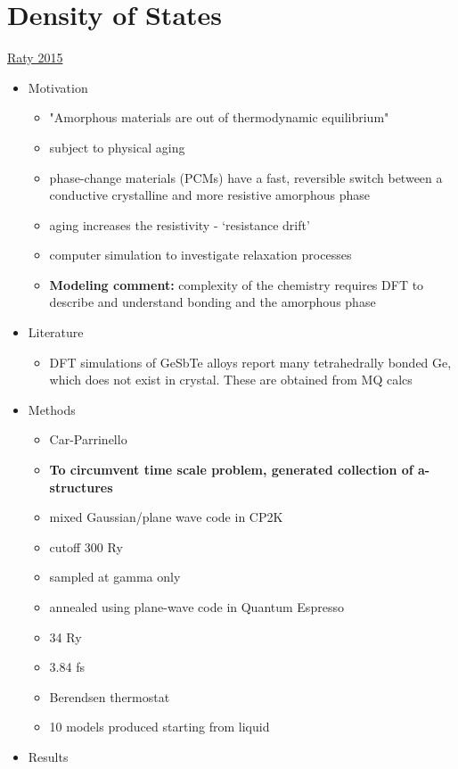 \documentclass[3p,review,12pt]{elsarticle}
\begin{document}
\section{Density of States}
\underline{Raty 2015 \cite{Raty2015}}
\par
\begin{itemize}
	\item Motivation
	\begin{itemize}
		\item "Amorphous materials are out of thermodynamic equilibrium"
		\item subject to physical aging
		\item phase-change materials (PCMs) have a fast, reversible switch between a conductive crystalline and more resistive amorphous phase
		\item aging increases the resistivity - `resistance drift'
		\item computer simulation to investigate relaxation processes
		\item \textbf{Modeling comment:} complexity of the chemistry requires DFT to describe and understand bonding and the amorphous phase
	\end{itemize}
	\item Literature
	\begin{itemize}
		\item DFT simulations of GeSbTe alloys report many tetrahedrally bonded Ge, which does not exist in crystal. These are obtained from MQ calcs
	\end{itemize}
	\item Methods
	\begin{itemize}
		\item Car-Parrinello
		\item \textbf{To circumvent time scale problem, generated collection of a-structures}
		\item mixed Gaussian/plane wave code in CP2K
		\item cutoff 300 Ry
		\item sampled at gamma only
		\item annealed using plane-wave code in Quantum Espresso
		\item 34 Ry
		\item 3.84 fs
		\item Berendsen thermostat
		\item 10 models produced starting from liquid
	\end{itemize}	
 	\item Results
 	\begin{itemize}

\end{itemize}
\end{itemize}
\end{document}
